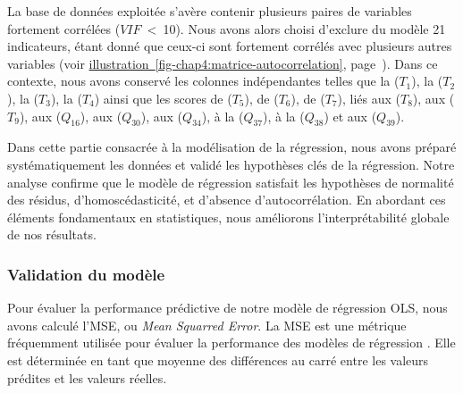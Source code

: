 \begin{refsegment}
La base de données exploitée s'avère contenir plusieurs paires de variables fortement corrélées (\(VIF\)~\textless~10). Nous avons alors choisi d'exclure du modèle 21 indicateurs, étant donné que ceux-ci sont fortement corrélés avec plusieurs autres variables (voir \hyperref[fig-chap4:matrice-autocorrelation]{illustration~\ref{fig-chap4:matrice-autocorrelation}}, page~\pageref{fig-chap4:matrice-autocorrelation}). Dans ce contexte, nous avons conservé les colonnes indépendantes telles que la  (\(T_{1}\)), la  (\(T_{2}\)), la  (\(T_{3}\)), la  (\(T_{4}\)) ainsi que les scores de  (\(T_{5}\)), de  (\(T_{6}\)), de  (\(T_{7}\)), liés aux  (\(T_{8}\)), aux  (\(T_{9}\)), aux  (\(Q_{16}\)), aux  (\(Q_{30}\)), aux  (\(Q_{34}\)), à la  (\(Q_{37}\)), à la  (\(Q_{38}\)) et aux  (\(Q_{39}\)).%

Dans cette partie consacrée à la modélisation de la régression, nous avons préparé systématiquement les données et validé les hypothèses clés de la régression. Notre analyse confirme que le modèle de régression satisfait les hypothèses de normalité des résidus, d'homoscédasticité, et d'absence d'autocorrélation. En abordant ces éléments fondamentaux en statistiques, nous améliorons l'interprétabilité globale de nos résultats.%

\subsubsection*{Validation du modèle
    \label{chap4:methodologie-validation}
    }

Pour évaluer la performance prédictive de notre modèle de régression \acrshort{OLS}, nous avons calculé l'\acrfull{MSE}, ou \textsl{Mean Squarred Error}. La \acrshort{MSE} est une \gls{métrique} fréquemment utilisée pour évaluer la performance des modèles de régression \textcolor{blue}{\autocite{cochran_sampling_1963}}. Elle est déterminée en tant que moyenne des différences au carré entre les valeurs prédites et les valeurs réelles.%


\end{refsegment}
